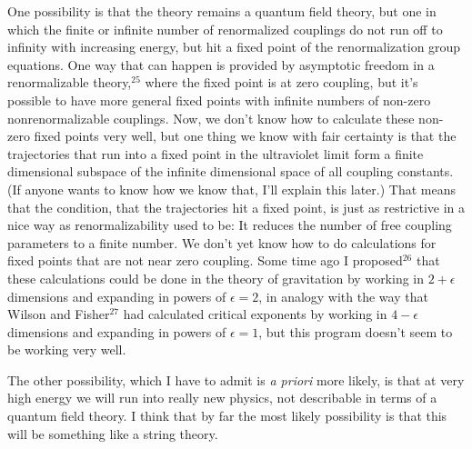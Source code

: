 \documentclass[12pt]{article}
\begin{document}
One possibility is that the theory remains a quantum field
theory, but one in which  the finite or infinite number of
renormalized couplings do not run off to infinity with
increasing energy, but hit a fixed point of the
renormalization group equations.  One way that can happen
is provided by asymptotic freedom in a renormalizable
theory,$^{25}$ where the fixed point is at zero coupling,
but it's
possible to have more general fixed points with infinite
numbers of non-zero nonrenormalizable couplings.  Now, we
don't know how to calculate these non-zero fixed points very
well, but one thing we know with fair certainty is that the
trajectories that run into a fixed point in the ultraviolet
limit form a finite dimensional subspace of the infinite
dimensional space of all coupling constants.  (If anyone
wants to know how we know that, I'll explain this later.)
That means that the condition, that the trajectories hit a
fixed point, is just as restrictive in a nice way as
renormalizability used to be:  It  reduces the number of
free coupling parameters to a finite number.  We don't yet
know how to do calculations for fixed points that are not
near zero coupling.  Some time ago I proposed$^{26}$ that
these
calculations could be done in the theory of gravitation by
working in $2 + \epsilon$ dimensions and expanding in powers
of $\epsilon=2$, in analogy with the way  that Wilson and
Fisher$^{27}$ had calculated critical exponents by working
in
$4 - \epsilon$ dimensions and expanding in powers of
$\epsilon=1$, but this program doesn't seem to be working
very well.

 The other possibility, which I have to admit is {\em a
priori} more likely, is that at very high energy we will run
into  really new physics, not describable in terms of a
quantum field theory.  I think that by far the most likely
possibility is that this will be something like a string
theory.
\end{document}
